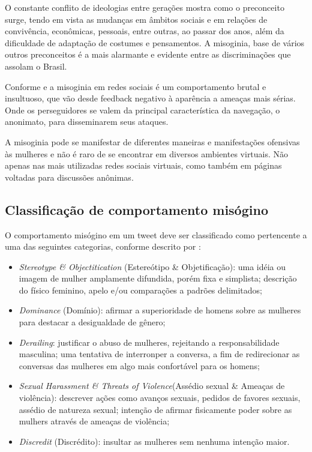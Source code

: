 \documentclass[
	12pt,				%
	openright,			%
	twoside,			%
	a4paper,			%
	english,			%
	french,				%
	spanish,			%
	brazil				%
	]{abntex2}
\begin{document}
O constante conflito de ideologias entre gerações mostra como o preconceito surge, tendo em vista as mudanças em âmbitos sociais e em relações de convivência, econômicas, pessoais, entre outras, ao passar dos anos, além da dificuldade de adaptação de costumes e pensamentos. A misoginia, base de vários outros preconceitos é a mais alarmante e evidente entre as discriminações que assolam o Brasil. \cite{da2017valores}

Conforme  e  a misoginia em redes sociais é um comportamento brutal e insultuoso, que vão desde feedback negativo à aparência a ameaças mais sérias. Onde os perseguidores se valem da principal característica da navegação, o anonimato, para disseminarem  seus ataques.

A misoginia pode se manifestar de diferentes maneiras e manifestações ofensivas às mulheres e não é raro de se encontrar em diversos ambientes virtuais. Não apenas nas mais utilizadas redes sociais virtuais, como também em páginas voltadas para discussões anônimas.\cite{pazo2016misoginia}


\subsection{Classificação de comportamento misógino}
O comportamento misógino em um tweet deve ser classificado como pertencente a uma das seguintes categorias, conforme descrito por \cite{fersini2018overview}:
	\begin{itemize}
	\item \emph{Stereotype \& Objectitication} (Estereótipo \& Objetificação): uma idéia ou imagem de mulher amplamente difundida, porém fixa e simplista; descrição do físico feminino, apelo e/ou comparações a padrões delimitados;
	\item \emph{Dominance} (Domínio): afirmar a superioridade de homens sobre as mulheres para destacar a desigualdade de gênero;
	\item \emph{Derailing}: justificar o abuso de mulheres, rejeitando a responsabilidade masculina; uma tentativa de interronper a conversa, a fim de redirecionar as conversas das mulheres em algo mais confortável para os homens; 
	\item \emph{Sexual Harassment \& Threats of Violence}(Assédio sexual \& Ameaças de violência): descrever ações como avanços sexuais, pedidos de favores sexuais, assédio de natureza sexual; intenção de afirmar fisicamente poder sobre as mulhers através de ameaças de violência;
	\item \emph{Discredit} (Discrédito): insultar as mulheres sem nenhuma intenção maior. 
	\end{itemize}
\end{document}
